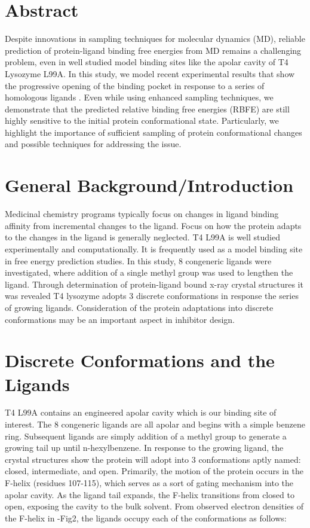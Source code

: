 \documentclass{article}
\begin{document}
\pagebreak

\section{Abstract}
Despite innovations in sampling techniques for molecular dynamics (MD), reliable prediction of protein-ligand binding free energies from MD remains a challenging problem, even in well studied model binding sites like the apolar cavity of T4 Lysozyme L99A\cite{Boyce2009}. 
In this study, we model recent experimental results that show the progressive opening of the binding pocket in response to a series of homologous ligands \cite{Merski2015}. 
Even while using enhanced sampling techniques, we demonstrate that the predicted relative binding free energies (RBFE) are still highly sensitive to the initial protein conformational state. 
Particularly, we highlight the importance of sufficient sampling of protein conformational changes and possible techniques for addressing the issue.

\section{General Background/Introduction}
Medicinal chemistry programs typically focus on changes in ligand binding affinity from incremental changes to the ligand.
Focus on how the protein adapts to the changes in the ligand is generally neglected.
T4 L99A is well studied experimentally and computationally. 
It is frequently used as a model binding site in free energy prediction studies.
In this study, 8 congeneric ligands were investigated, where addition of a single methyl group was used to lengthen the ligand.
Through determination of protein-ligand bound x-ray crystal structures it was revealed T4 lysozyme adopts 3 discrete conformations in response the series of growing ligands.
Consideration of the protein adaptations into discrete conformations may be an important aspect in inhibitor design.

\section{Discrete Conformations and the Ligands}
T4 L99A contains an engineered apolar cavity which is our binding site of interest.
The 8 congeneric ligands are all apolar and begins with a simple benzene ring. 
Subsequent ligands are simply addition of a methyl group to generate a growing tail up until n-hexylbenzene.
In response to the growing ligand, the crystal structures show the protein will adopt into 3 conformations aptly named: closed, intermediate, and open.
Primarily, the motion of the protein occurs in the F-helix (residues 107-115), which serves as a sort of gating mechanism into the apolar cavity.
As the ligand tail expands, the F-helix transitions from closed to open, exposing the cavity to the bulk solvent.
From observed electron densities of the F-helix in \cite{Merski2015}-Fig2, the ligands occupy each of the conformations as follows:
\end{document}
